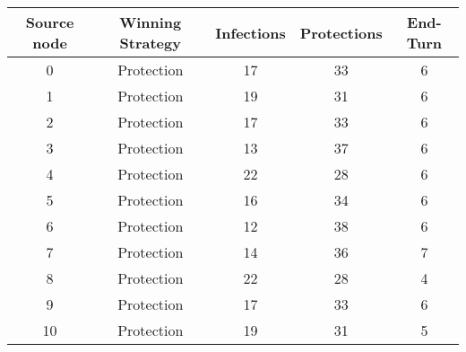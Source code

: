 \documentclass[results.tex]{subfiles}
\begin{document}
    \begin{center}
        \begin{tabular}{| c || c | c | c | c |}
            \hline
            {\bfseries Source node} & {\bfseries Winning Strategy} & {\bfseries Infections} & {\bfseries Protections}
            & {\bfseries End-Turn}
            \\  %
            \hline\hline
            0                       & Protection                   & 17                     & 33                      & 6                    \\
            \hline
            1                       & Protection                   & 19                     & 31                      & 6                    \\
            \hline
            2                       & Protection                   & 17                     & 33                      & 6                    \\
            \hline
            3                       & Protection                   & 13                     & 37                      & 6                    \\
            \hline
            4                       & Protection                   & 22                     & 28                      & 6                    \\
            \hline
            5                       & Protection                   & 16                     & 34                      & 6                    \\
            \hline
            6                       & Protection                   & 12                     & 38                      & 6                    \\
            \hline
            7                       & Protection                   & 14                     & 36                      & 7                    \\
            \hline
            8                       & Protection                   & 22                     & 28                      & 4                    \\
            \hline
            9                       & Protection                   & 17                     & 33                      & 6                    \\
            \hline
            10                      & Protection                   & 19                     & 31                      & 5                    \\

\end{tabular}
\end{center}
\end{document}
